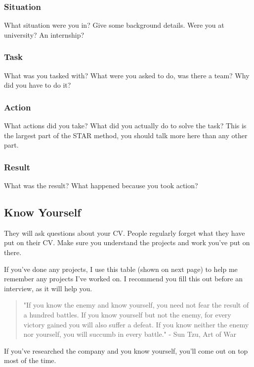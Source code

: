 \documentclass{article}
\begin{document}
\subsubsection{Situation}
What situation were you in? Give some background details. Were you at university? An internship?
\subsubsection{Task}
What was you tasked with? What were you asked to do, was there a team? Why did you have to do it?
\subsubsection{Action}
What actions did you take? What did you actually do to solve the task? This is the largest part of the STAR method, you should talk more here than any other part.
\subsubsection{Result}
What was the result? What happened because you took action?
\subsection{Know Yourself}
They will ask questions about your CV. People regularly forget what they
have put on their CV. Make sure you understand the projects and work
you've put on there.

If you've done any projects, I use this table (shown on next page) to help me remember any projects I've worked on. I recommend you fill this
out before an interview, as it will help you.

\begin{quote}
"If you know the enemy and know yourself, you need not fear the result
of a hundred battles. If you know yourself but not the enemy, for every
victory gained you will also suffer a defeat. If you know neither the
enemy nor yourself, you will succumb in every battle." - Sun Tzu, Art
of War \end{quote}

If you've researched the company and you know yourself, you'll come out
on top most of the time.
\newpage

\end{document}
